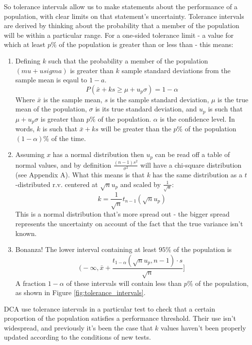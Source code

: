 \documentclass[11pt,a4paper,article]{memoir} %
\begin{document}
So tolerance intervals allow us to make statements about the performance of a population, with clear limits on that statement's uncertainty. Tolerance intervals are derived by thinking about the probability that a member of the population will be within a particular range. For a one-sided tolerance limit - a value for which at least $p\%$ of the population is greater than or less than - this means:
\begin{enumerate}
	\item Defining $k$ such that the probability a member of the population $(mu + u sigma)$ is greater than $k$ sample standard deviations from the sample mean is eqaul to $1 - a$.
		\begin{equation}
			P(\bar{x} + ks \geq \mu + u_p \sigma) = 1 - \alpha
			\label{eq:tol_interval}
		\end{equation}
	Where $\bar{x}$ is the sample mean, $s$ is the sample standard deviation, $\mu$ is the true mean of the population, $\sigma$ is its true standard deviation, and $u_p$ is such that $\mu + u_p\sigma$ is greater than $p\%$ of the population. $\alpha$ is the confidence level. \newline In words, $k$ is such that $\bar{x} + ks$ will  be greater than the $p\%$ of the population $(1 - \alpha)\%$ of the time.
	\item Assuming $x$ has a normal distribution then $u_p$ can be read off a table of normal values, and by definition $\frac{(n-1)s^2}{\sigma^2}$ will have a chi-square distribution (see Appendix A). What this means is that $k$ has the same distribution as a $t$-distributed r.v. centered at $\sqrt{n}u_p$ and scaled by $\frac{1}{\sqrt{n}}$:
		\begin{equation}
			k = \frac{1}{\sqrt{n}}t_{n - 1}(\sqrt{n}u_p) 
		\end{equation}
		This is a normal distribution that's more spread out - the bigger spread represents the uncertainty on account of the fact that the true variance isn't known.
	\item  Bonanza! The lower interval containing at least $95\%$  of the population is
\begin{equation}
	\Big(-\infty, \bar{x} + \frac{t_{1 - \alpha}(\sqrt{n}u_p, n - 1)\cdot s}{\sqrt{n}}\Big]
\end{equation}
A fraction $1 - \alpha$ of these intervals will contain less than $p\%$ of the population, as shown in Figure \ref{fig:tolerance_intervals}. 
\end{enumerate}
DCA use tolerance intervals in a particular test to check that a certain proportion of the population satisfies a performance threshold. Their use isn't widespread, and previously it's been the case that $k$ values haven't been properly updated according to the conditions of new tests.
\end{document}
